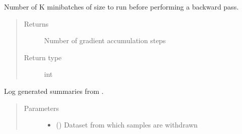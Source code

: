 \documentclass[letterpaper,10pt,english]{sphinxmanual}
\begin{document}
\begin{fulllineitems}
\begin{fulllineitems}
\end{fulllineitems}


\begin{fulllineitems}
\label{\detokenize{code:gpt2_summarizer.GPT2Summarizer.gradient_accumulation_steps}}
\sphinxAtStartPar
Number of K mini\sphinxhyphen{}batches of size  to run before performing a backward
pass.
\begin{quote}\begin{description}
\item[{Returns}] \leavevmode
\sphinxAtStartPar
Number of gradient accumulation steps

\item[{Return type}] \leavevmode
\sphinxAtStartPar
int

\end{description}\end{quote}

\end{fulllineitems}


\begin{fulllineitems}
\label{\detokenize{code:gpt2_summarizer.GPT2Summarizer.log_generated_summaries}}
\sphinxAtStartPar
Log  generated summaries from .
\begin{quote}\begin{description}
\item[{Parameters}] \leavevmode\begin{itemize}
\item {} 
\sphinxAtStartPar
{} () \textendash{} Dataset from which samples are withdrawn


\end{itemize}
\end{description}
\end{quote}
\end{fulllineitems}
\end{fulllineitems}
\end{document}
